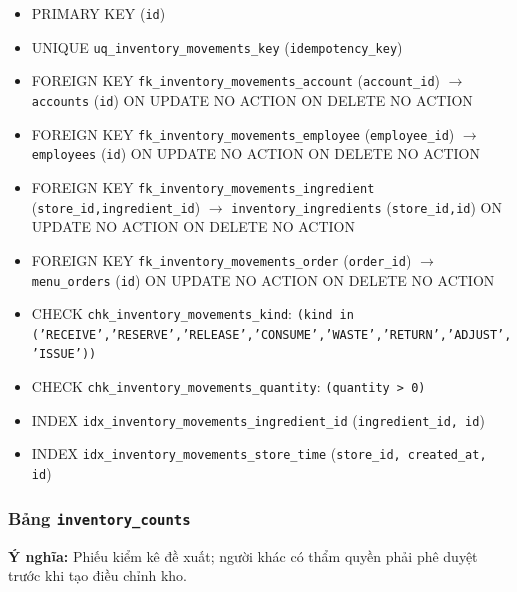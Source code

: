 \begin{itemize}

\item PRIMARY KEY (\texttt{id})

\item UNIQUE \texttt{uq\_inventory\_movements\_key} (\texttt{idempotency\_key})

\item FOREIGN KEY \texttt{fk\_inventory\_movements\_account} (\texttt{account\_id}) $\rightarrow$ \texttt{accounts} (\texttt{id}) ON UPDATE NO ACTION ON DELETE NO ACTION

\item FOREIGN KEY \texttt{fk\_inventory\_movements\_employee} (\texttt{employee\_id}) $\rightarrow$ \texttt{employees} (\texttt{id}) ON UPDATE NO ACTION ON DELETE NO ACTION

\item FOREIGN KEY \texttt{fk\_inventory\_movements\_ingredient} (\texttt{store\_id,ingredient\_id}) $\rightarrow$ \texttt{inventory\_ingredients} (\texttt{store\_id,id}) ON UPDATE NO ACTION ON DELETE NO ACTION

\item FOREIGN KEY \texttt{fk\_inventory\_movements\_order} (\texttt{order\_id}) $\rightarrow$ \texttt{menu\_orders} (\texttt{id}) ON UPDATE NO ACTION ON DELETE NO ACTION

\item CHECK \texttt{chk\_inventory\_movements\_kind}: \texttt{(kind in ('RECEIVE','RESERVE','RELEASE','CONSUME','WASTE','RETURN','ADJUST','ISSUE'))}

\item CHECK \texttt{chk\_inventory\_movements\_quantity}: \texttt{(quantity > 0)}

\item INDEX \texttt{idx\_inventory\_movements\_ingredient\_id} (\texttt{ingredient\_id, id})

\item INDEX \texttt{idx\_inventory\_movements\_store\_time} (\texttt{store\_id, created\_at, id})

\end{itemize}

\subsubsection{Bảng \texttt{inventory\_counts}}

\textbf{Ý nghĩa:} Phiếu kiểm kê đề xuất; người khác có thẩm quyền phải phê duyệt trước khi tạo điều chỉnh kho.\par

